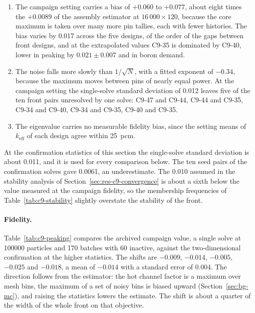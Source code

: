 \begin{enumerate}
  \item The campaign setting carries a bias of $+0.060$ to $+0.077$, about
        eight times the $+0.0089$ of the assembly estimator at
        $16\,000\times120$, because the core maximum is taken over many
        more pin tallies, each with fewer histories. The bias varies by
        0.017 across the five designs, of the order of the gaps between
        front designs, and at the extrapolated values C9-35 is dominated
        by C9-40, lower in peaking by $0.021 \pm 0.007$ and in boron
        demand.

  \item The noise falls more slowly than $1/\sqrt{N}$, with a fitted
        exponent of $-0.34$, because the maximum moves between pins of
        nearly equal power. At the campaign setting the single-solve
        standard deviation of 0.012 leaves five of the ten front pairs
        unresolved by one solve: C9-47 and C9-44, C9-44 and C9-35,
        C9-34 and C9-40, C9-34 and C9-35, C9-40 and C9-35.

  \item The eigenvalue carries no measurable fidelity bias, since the
        setting means of $k_\mathrm{eff}$ of each design agree within
        \SI{25}{pcm}.
\end{enumerate}

At the confirmation statistics of this section the single-solve
standard deviation is about 0.011, and it is used for every comparison
below. The ten seed pairs of the confirmation solves gave 0.0061, an
underestimate. The 0.010 assumed in the stability analysis of
Section~\ref{sec:res-c9-convergence} is about a sixth below the value
measured at the campaign fidelity, so the membership frequencies of
Table~\ref{tab:c9-stability} slightly overstate the stability of the
front.

\paragraph{Fidelity.}
Table~\ref{tab:c9-peaking} compares the archived campaign value, a single
solve at \num{100000} particles and 170 batches with 60 inactive, against
the two-dimensional confirmation at the higher statistics. The shifts are
$-0.009$, $-0.014$, $-0.005$, $-0.025$ and $-0.018$, a mean of $-0.014$
with a standard error of 0.004. The direction follows from the estimator: the
hot channel factor is a maximum over mesh bins, the maximum of a set of
noisy bins is biased upward (Section~\ref{sec:bg-mc}), and raising the
statistics lowers the estimate. The shift is about a quarter of the width
of the whole front on that objective.

